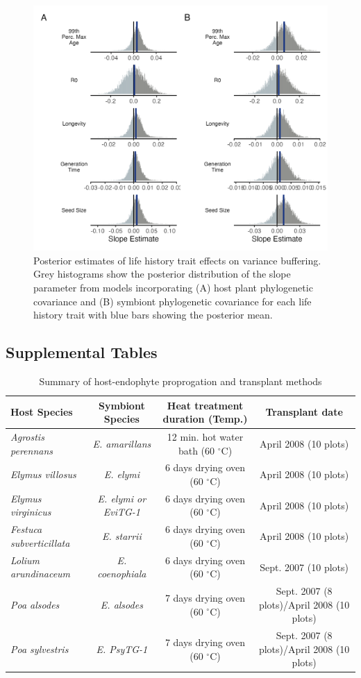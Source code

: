 \documentclass[9pt,twoside,lineno]{pnas-new}
\begin{document}
\begin{figure}
	\centering
	\includegraphics[width=.8\linewidth]{lh_slopes_plot.png}
	\caption{Posterior estimates of life history trait effects on variance buffering. Grey histograms show the posterior distribution of the slope parameter from models incorporating (A) host plant phylogenetic covariance and (B) symbiont phylogenetic covariance for each life history trait with blue bars showing the posterior mean.}
\end{figure}

\clearpage

\subsection*{Supplemental Tables}

\begin{table}\centering
	\caption{Summary of host-endophyte proprogation and transplant methods}
	
	\begin{tabular}{lccc}
			Host Species & Symbiont Species & Heat treatment duration (Temp.)& Transplant date\\
		\midrule
	\emph{Agrostis perennans} & \emph{E. amarillans}&12 min. hot water bath (60 $^{\circ}$C)&April 2008 (10 plots)\\
	\emph{Elymus villosus} &\emph{E. elymi}&6 days drying oven (60 $^{\circ}$C)&April 2008 (10 plots)\\
	\emph{Elymus virginicus} &\emph{E. elymi or EviTG-1}&6 days drying oven (60 $^{\circ}$C)&April 2008 (10 plots)\\
	\emph{Festuca subverticillata} &\emph{E. starrii}&6 days drying oven (60 $^{\circ}$C)&April 2008 (10 plots)\\
	\emph{Lolium arundinaceum} &\emph{E. coenophiala}&6 days drying oven (60 $^{\circ}$C)& Sept. 2007 (10 plots)\\
	\emph{Poa alsodes} &\emph{E. alsodes}& 7 days drying oven (60 $^{\circ}$C)&Sept. 2007 (8 plots)/April 2008 (10 plots)\\
	\emph{Poa sylvestris}&\emph{E. PsyTG-1}&7 days drying oven (60 $^{\circ}$C)& Sept. 2007 (8 plots)/April 2008 (10 plots)\\
		\bottomrule
	\end{tabular}
\end{table}
\end{document}

